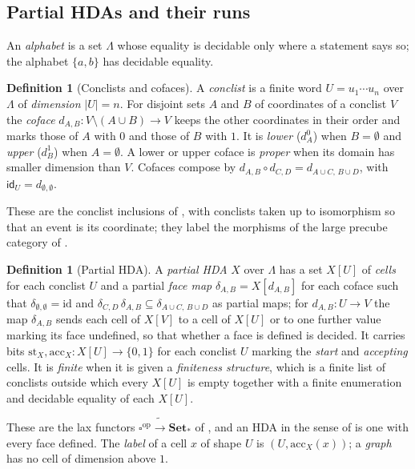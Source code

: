 \documentclass{lmcs}
\theoremstyle{definition}
\newtheorem{definition}[theorem]{Definition}
\theoremstyle{remark}
\newcommand{\Set}{\mathbf{Set}}
\newcommand{\ab}{\{a,b\}}
\newcommand{\Cube}{\square}
\newcommand{\dimn}[1]{\lvert #1\rvert}
\newcommand{\cid}{\mathsf{id}}
\newcommand{\st}{\mathrm{st}}
\newcommand{\acc}{\mathrm{acc}}
\begin{document}
\subsection{Partial HDAs and their runs}\label{ssec:phda}

An \emph{alphabet} is a set $\Lambda$ whose equality is decidable only where a statement says so; the
alphabet $\ab$ has decidable equality.

\begin{definition}[Conclists and cofaces]\label{def:coface}
A \emph{conclist} is a finite word $U=u_1\cdots u_n$ over $\Lambda$ of \emph{dimension} $\dimn{U}=n$. For
disjoint sets $A$ and $B$ of coordinates of a conclist $V$ the \emph{coface}
$d_{A,B}\colon V\setminus(A\cup B)\to V$ keeps the other coordinates in their order and marks those of $A$
with $0$ and those of $B$ with $1$. It is \emph{lower} ($d^0_A$) when $B=\emptyset$
and \emph{upper} ($d^1_B$) when $A=\emptyset$. A lower or upper coface is \emph{proper}
when its domain has smaller dimension than $V$. Cofaces compose by $d_{A,B}\circ d_{C,D}=d_{A\cup C,\,B\cup D}$, with $\cid_U=d_{\emptyset,\emptyset}$.
\end{definition}

These are the conclist inclusions of \cite{BDFZ26}, with conclists
taken up to isomorphism so that an event is its coordinate; they label
the morphisms of the large precube category of \cite{FJSZ21}.

\begin{definition}[Partial HDA]\label{def:phda}
A \emph{partial HDA} $X$ over $\Lambda$ has a set $X[U]$ of \emph{cells} for each conclist $U$ and a partial
\emph{face map} $\delta_{A,B}=X[d_{A,B}]$ for each coface such that $\delta_{\emptyset,\emptyset}=\mathrm{id}$ and
$\delta_{C,D}\,\delta_{A,B}\subseteq\delta_{A\cup C,\,B\cup D}$ as partial maps; for
$d_{A,B}\colon U\to V$ the map $\delta_{A,B}$ sends each cell of $X[V]$ to a cell of $X[U]$ or to one further value
marking its face undefined, so that whether a face is defined is decided. It carries
bits $\st_X,\acc_X\colon X[U]\to\{0,1\}$ for each conclist $U$ marking the \emph{start} and \emph{accepting} cells.
It is \emph{finite} when it is given a \emph{finiteness structure}, which is a finite list of conclists outside
which every $X[U]$ is empty together with a finite enumeration and decidable equality of each
$X[U]$.
\end{definition}

These are the lax functors $\Cube^{\mathrm{op}}\mathrel{\tilde{\rightarrow}}\Set_\ast$ of
\cite{BDFZ26},
and an HDA in the sense of
\cite{PAF25} is one with every face defined.
The \emph{label} of a cell $x$ of shape $U$ is $(U,\acc_X(x))$; a \emph{graph} has no cell of dimension above $1$.
\end{document}
